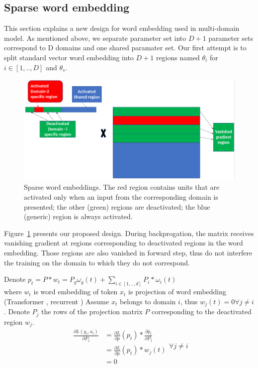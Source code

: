 \documentclass[11pt,a4paper]{article}
\newcommand{\fyTodo}[1]{\Todo[FY>]{\textcolor{orange}{#1}}}
\begin{document}
\subsection{Sparse word embedding}
\label{sec:sparse}
This section explains a new design for word embedding used in multi-domain model. As mentioned above, we separate parameter set into $D+1$ parameter sets correspond to D domains and one shared paramater set. Our first attempt is to split standard vector word embedding into $D+1$ regions named $\theta_i$ for $i \in [1,..,D]$ and $\theta_s$.
\begin{figure}[h]
\center
    \includegraphics[width=0.8\linewidth]{Sparse1}
    \caption{Sparse word embeddings. The red region contains units that are activated only when an input from the corresponding domain is presented; the other (green) regions are deactivated; the blue (generic) region is always activated.} 
    \label{fig:network}
  \end{figure}
\fyTodo{Explain vanishing ?}
Figure~\ref{fig:network} presents our proposed design. During backprogation, the  matrix receives vanishing gradient at regions corresponding to deactivated regions in the word embedding. Those regions are also vanished in forward step, thus do not interfere the training on the domain to which they do not correspond.

Denote
$p_{t} = P * w_{t} = P_g \omega_g(t) + \displaystyle{\mathop{\sum}_{i \in [1,..,d]} P_i * \omega_i(t)}$\\
where $w_{t}$ is word embedding of token $x_{t}$  is projection of word embedding (Transformer \cite{NIPS2017_7181}, recurrent \cite{bahdanau2014neural})
Assume $x_{t}$ belongs to domain $i$, thus $w_j(t) = 0 \forall j \neq i$. Denote $P_j$ the rows of the projection matrix $P$ corresponding to the deactivated region $w_j$.
\begin{equation}
\begin{split}
\frac{\partial L(y_t,x_t)}{\partial P_j} &=\frac{\partial L}{\partial p}(p_t) * \frac{\partial p_t}{\partial P_j} \\
								&= \frac{\partial L}{\partial p}(p_t) * w_j(t)\\
									&=0
\end{split} 
\forall j \neq i
\end{equation}
\end{document}
